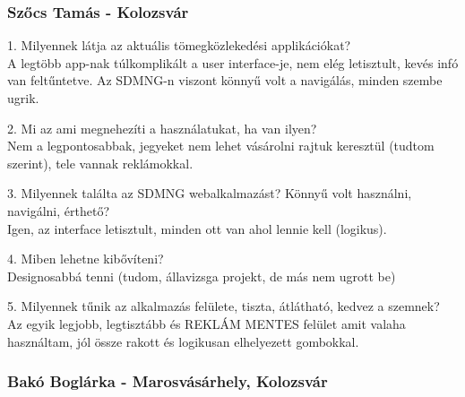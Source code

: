 \subsubsection{Szőcs Tamás - Kolozsvár}
1. Milyennek látja az aktuális tömegközlekedési applikációkat? \\
A legtöbb app-nak túlkomplikált a user interface-je, nem elég letisztult, kevés infó van feltűntetve. Az SDMNG-n viszont könnyű volt a navigálás, minden szembe ugrik.

2. Mi az ami megnehezíti a használatukat, ha van ilyen? \\
Nem a legpontosabbak, jegyeket nem lehet vásárolni rajtuk keresztül (tudtom szerint), tele vannak reklámokkal.

3. Milyennek találta az SDMNG webalkalmazást? Könnyű volt használni, navigálni, érthető? \\
Igen, az interface letisztult, minden ott van ahol lennie kell (logikus).

4. Miben lehetne kibővíteni?\\
Designosabbá tenni (tudom, állavizsga projekt, de más nem ugrott be)

5. Milyennek tűnik az alkalmazás felülete, tiszta, átlátható, kedvez a szemnek?\\
Az egyik legjobb, legtisztább és REKLÁM MENTES felület amit valaha használtam, jól össze rakott és logikusan elhelyezett gombokkal.

\subsubsection{Bakó Boglárka - Marosvásárhely, Kolozsvár}

